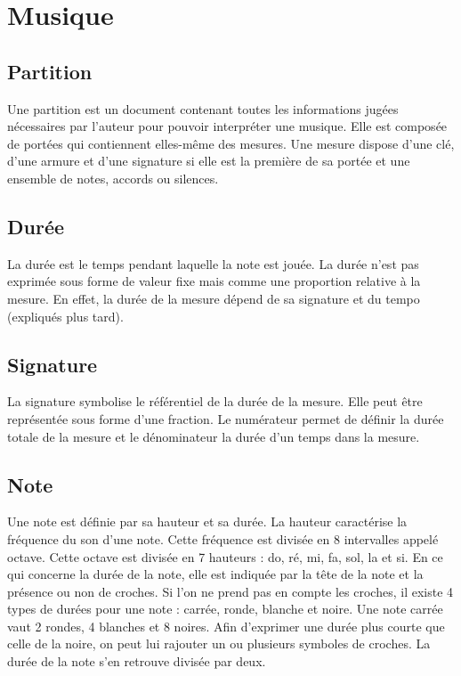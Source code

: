 \section{Musique}

\subsection{Partition}

Une partition est un document contenant toutes les informations jugées nécessaires par l'auteur pour pouvoir interpréter une musique. Elle est composée de portées qui contiennent elles-même des mesures. Une mesure dispose d'une clé, d'une armure et d'une signature si elle est la première de sa portée et une ensemble de notes, accords ou silences.


\subsection{Durée}

La durée est le temps pendant laquelle la note est jouée. La durée n'est pas exprimée sous forme de valeur fixe mais comme une proportion relative à la mesure. En effet, la durée de la mesure dépend de sa signature et du tempo (expliqués plus tard). 


\subsection{Signature}

La signature symbolise le référentiel de la durée de la mesure. Elle peut être représentée sous forme d'une fraction. Le numérateur permet de définir la durée totale de la mesure et le dénominateur la durée d'un temps dans la mesure. 

\subsection{Note}

Une note est définie par sa hauteur et sa durée. La hauteur caractérise la fréquence du son d'une note. Cette fréquence est divisée en 8 intervalles appelé octave. Cette octave est divisée en 7 hauteurs : do, ré, mi, fa, sol, la et si. En ce qui concerne la durée de la note, elle est indiquée par la tête de la note et la présence ou non de croches. Si l'on ne prend pas en compte les croches, il existe 4 types de durées pour une note : carrée, ronde, blanche et noire. Une note carrée vaut 2 rondes, 4 blanches et 8 noires. Afin d'exprimer une durée plus courte que celle de la noire, on peut lui rajouter un ou plusieurs symboles de croches. La durée de la note s'en retrouve divisée par deux.

